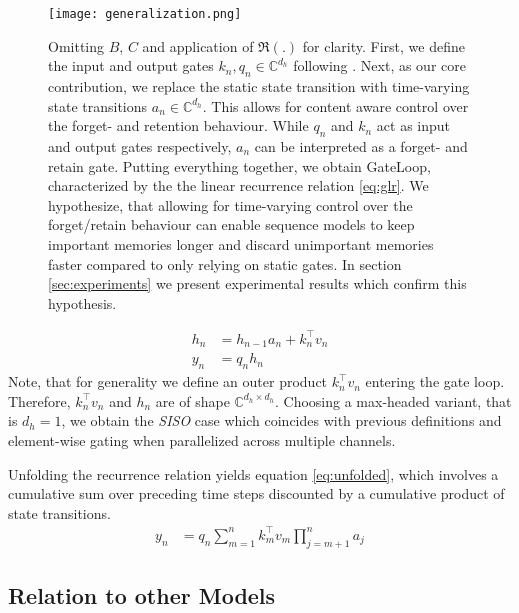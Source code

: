 \documentclass{article} \usepackage{iclr2024_conference,times}
\begin{document}
\begin{figure}[H]
\begin{center}
\texttt{[image: generalization.png]}
\end{center}
\caption{Omitting $B$, $C$ and application of $\Re(.)$ for clarity. First, we define the input and output gates $k_n, q_n \in \mathbb{C}^{d_h}$ following \cite{sun2023retentive}. Next, as our core contribution, we replace the static state transition with time-varying state transitions $a_n \in \mathbb{C}^{d_h}$. This allows for content aware control over the forget- and retention behaviour. While $q_n$ and $k_n$ act as input and output gates respectively, $a_n$ can be interpreted as a forget- and retain gate. Putting everything together, we obtain GateLoop, characterized by the the linear recurrence relation \ref{eq:glr}. We hypothesize, that allowing for time-varying control over the forget/retain behaviour can enable sequence models to keep important memories longer and discard unimportant memories faster compared to only relying on static gates. In section \ref{sec:experiments} we present experimental results which confirm this hypothesis.}
\label{fig:generalization}
\vspace{-2em}
\end{figure}
\begin{align}\label{eq:glr}
h_n &= h_{n-1} a_n + k_n^{\top} v_n \\
y_n &= q_n h_n
\end{align}
\vspace{0.3em}
Note, that for generality we define an outer product $k_n^{\top} v_n$ entering the gate loop. Therefore, $k_n^{\top} v_n$ and $h_n$ are of shape $\mathbb{C}^{d_h \times d_h}$. Choosing a max-headed variant, that is $d_h = 1$, we obtain the \textit{SISO} case which coincides with previous definitions and element-wise gating when parallelized across multiple channels. 

Unfolding the recurrence relation yields equation \ref{eq:unfolded}, which involves a cumulative sum over preceding time steps discounted by a cumulative product of state transitions. 
\vspace{0.3em}
\begin{align} \label{eq:unfolded}
y_n &= q_n \sum_{m=1}^{n} k_m^\top v_m \prod_{j=m+1}^{n} a_j
\end{align}

\newpage

\subsection{Relation to other Models}
\end{document}
